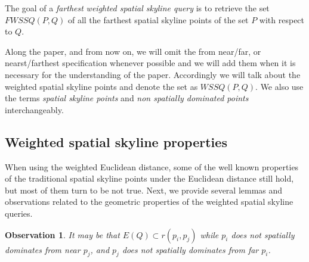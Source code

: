 \documentclass[11pt,onecolumn]{elsart3p}
\newtheorem{observation}{Observation}
\begin{document}
        \vspace{1em} The goal of a {\it farthest} {\it weighted spatial skyline query} is to retrieve the set $FWSSQ(P,Q)$ of all the farthest spatial skyline points of the set $P$ with respect to $Q$. \vspace{1em}


        Along the paper, and from now on, we will omit the from near/far, or nearst/farthest specification whenever possible and we will add them when it is necessary for the understanding of the paper. Accordingly we will talk about the weighted spatial skyline points and denote the set as $WSSQ(P,Q)$. We also use the terms {\it spatial skyline points} and {\it non spatially dominated points} interchangeably.

        \subsection{Weighted spatial skyline properties}

        When using the weighted Euclidean distance, some of the well known properties of the traditional spatial skyline points under the Euclidean distance still hold, but most of them turn to be not true. Next, we provide several lemmas and observations related to the geometric properties of the weighted spatial skyline queries.\\





        \vspace{1em}
        \begin{observation} It may be that $E(Q) \subset r(p_i, p_j)$ while $p_i$ does not spatially dominates from near $p_j$, and  $p_j$ does not spatially dominates from far $p_i$.
        \label{obs:w_noCHInrij}
        \end{observation}
\end{document}
